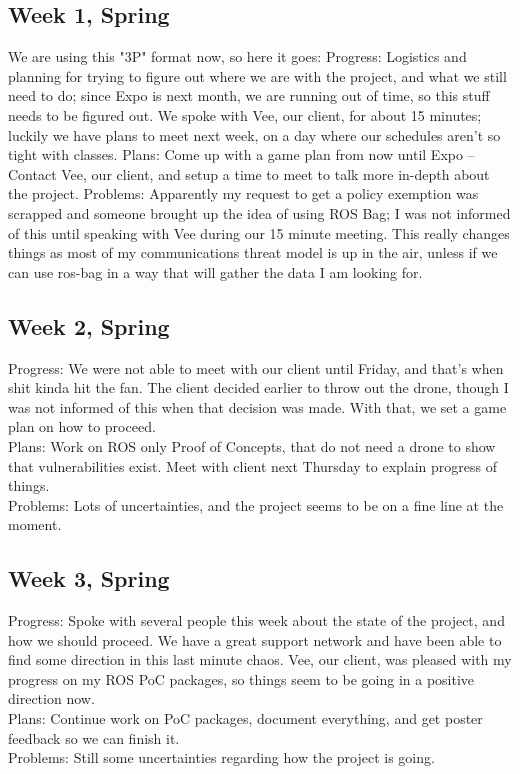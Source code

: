 \documentclass[IEEEtran,letterpaper,10pt,notitlepage,draftclsnofoot,onecolumn]{article}
\begin{document}
\begin{sloppypar}
\subsection{Week 1, Spring}
We are using this "3P" format now, so here it goes:
Progress: Logistics and planning for trying to figure out where we are with the project, and what we still need to do; since Expo is next month, we are running out of time, so this stuff needs to be figured out. We spoke with Vee, our client, for about 15 minutes; luckily we have plans to meet next week, on a day where our schedules aren't so tight with classes.
Plans: Come up with a game plan from now until Expo -- Contact Vee, our client, and setup a time to meet to talk more in-depth about the project.
Problems: Apparently my request to get a policy exemption was scrapped and someone brought up the idea of using ROS Bag; I was not informed of this until speaking with Vee during our 15 minute meeting. This really changes things as most of my communications threat model is up in the air, unless if we can use ros-bag in a way that will gather the data I am looking for.
\subsection{Week 2, Spring}
Progress: We were not able to meet with our client until Friday, and that's when shit kinda hit the fan. The client decided earlier to throw out the drone, though I was not informed of this when that decision was made. With that, we set a game plan on how to proceed. \\
Plans: Work on ROS only Proof of Concepts, that do not need a drone to show that vulnerabilities exist. Meet with client next Thursday to explain progress of things. \\
Problems: Lots of uncertainties, and the project seems to be on a fine line at the moment. \\
\subsection{Week 3, Spring}
Progress: Spoke with several people this week about the state of the project, and how we should proceed. We have a great support network and have been able to find some direction in this last minute chaos. Vee, our client, was pleased with my progress on my ROS PoC packages, so things seem to be going in a positive direction now. \\
Plans: Continue work on PoC packages, document everything, and get poster feedback so we can finish it. \\
Problems: Still some uncertainties regarding how the project is going. \\

\end{sloppypar}
\end{document}
